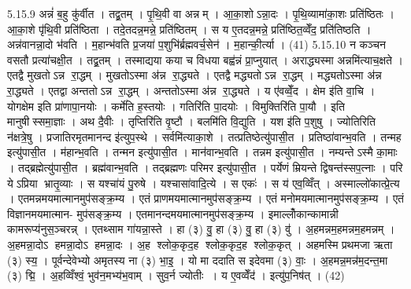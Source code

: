 5.15.9
अन्नं॑ ब॒हु कु॑र्वीत । तद्व्र॒तम् । पृ॒थि॒वी वा अन्नम् । आ॒का॒शोऽन्ना॒दः । पृ॒थि॒व्यामा॑का॒शः प्रति॑ष्ठितः । आ॒का॒शे पृ॑थि॒वी प्रति॑ष्ठिता । तदे॒तदन्न॒मन्ने॒ प्रति॑ष्ठितम् । स य ए॒तदन्न॒मन्ने॒ प्रति॑ष्ठित॒व्वेँद॒ प्रति॑तिष्ठति । अन्न॑वानन्ना॒दो भ॑वति । म॒हान्भ॑वति प्र॒जया॑ प॒शुभि॑र्ब्रह्मवर्च॒सेन॑ । म॒हान्की॒र्त्या । (41)
5.15.10
न कञ्चन वसतौ प्रत्या॑चक्षी॒त । तद्व्र॒तम् । तस्माद्यया कया च विधया बह्व॑न्नं प्रा॒प्नुयात् । अराद्ध्यस्मा अन्नमि॑त्याच॒क्षते । एतद्वै मुखतोऽन्न रा॒द्धम् । मुखतोऽस्मा अ॑न्न रा॒द्ध्यते । एतद्वै मद्ध्यतोऽन्न रा॒द्धम् । मद्ध्यतोऽस्मा अ॑न्न रा॒द्ध्यते । एतद्वा अन्ततोऽन्न रा॒द्धम् । अन्ततोऽस्मा अ॑न्न रा॒द्ध्यते । य ए॑वव्वेँ॒द । क्षेम इ॑ति वा॒चि । योगक्षेम इति प्रा॑णापा॒नयोः । कर्मे॑ति ह॒स्तयोः । गतिरि॑ति पा॒दयोः । विमुक्तिरि॑ति पा॒यौ । इति मानुषीस्समा॒ज्ञाः । अथ दै॒वीः । तृप्तिरि॑ति वृ॒ष्टौ । बलमि॑ति वि॒द्युति । यश इ॑ति प॒शुषु । ज्योतिरिति न॑क्षत्रे॒षु । प्रजातिरमृतमानन्द इ॑त्युप॒स्थे । सर्वमि॑त्याका॒शे । तत्प्रतिष्ठेत्यु॑पासी॒त । प्रतिष्ठा॑वान्भ॒वति । तन्मह इत्यु॑पासी॒त । म॑हान्भ॒वति । तन्मन इत्यु॑पासी॒त । मान॑वान्भ॒वति । तन्नम इत्यु॑पासी॒त । नम्यन्तेऽस्मै का॒माः । तद्ब्रह्मेत्यु॑पासी॒त । ब्रह्म॑वान्भ॒वति । तद्ब्रह्मणः परिमर इत्यु॑पासी॒त । पर्येणं म्रियन्ते द्विषन्त॑स्सप॒त्नाः । परि येऽप्रिया भ्रातृ॒व्याः । स यश्चा॑यं पु॒रुषे । यश्चासा॑वादि॒त्ये । स एकः॑ । स य॑ एव॒व्विँत् । अस्माल्लो॑कात्प्रे॒त्य । एतमन्नमयमात्मानमुप॑सङ्क्र॒म्य । एतं प्राणमयमात्मानमुप॑सङ्क्र॒म्य । एतं मनोमयमात्मानमुप॑सङ्क्र॒म्य । एतं विज्ञानमयमात्मान- मुप॑सङ्क्र॒म्य । एतमानन्दमयमात्मानमुप॑सङ्क्र॒म्य । इमाल्लोँकान्कामान्नी कामरूप्य॑नुस॒ञ्चरन्न् । एतथ्साम गा॑यन्ना॒स्ते । हा (३) वु॒ हा (३) वु॒ हा (३) वु॑ । अ॒हमन्नम॒हमन्नम॒हमन्नम् । अ॒हमन्ना॒दोऽ हमन्ना॒दोऽ हमन्ना॒दः । अ॒ह श्लोक॒कृद॒ह श्लोक॒कृद॒ह श्लोक॒कृत् । अहमस्मि प्रथमजा ऋता (३) स्य॒ । पूर्वन्देवेभ्यो अमृतस्य ना (३) भा॒इ॒ । यो मा ददाति स इदेवमा (३) वाः॒ । अ॒हमन्न॒मन्न॑म॒दन्त॒मा (३) द्मि॒ । अ॒हव्विँश्वं॒ भुव॑न॒मभ्य॑भ॒वाम् । सुव॒र्न ज्योतीः । य ए॒वव्वेँद॑ । इत्यु॑प॒निष॑त् । (42)

